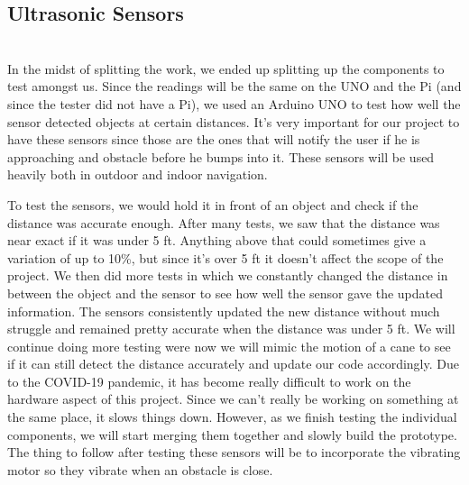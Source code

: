 \documentclass[letterpaper,12pt]{article}
\begin{document}
\subsection{Ultrasonic Sensors}
\newline \ \\
In the midst of splitting the work, we ended up splitting up the components to test amongst us. Since the readings will be the same on the UNO and the Pi (and since the tester did not have a Pi), we used an Arduino UNO to test how well the sensor detected objects at certain distances. It's very important for our project to have these sensors since those are the ones that will notify the user if he is approaching and obstacle before he bumps into it. These sensors will be used heavily both in outdoor and indoor navigation.

\newline 

To test the sensors, we would hold it in front of an object and check if the distance was accurate enough. After many tests, we saw that the distance was near exact if it was under 5 ft. Anything above that could sometimes give a variation of up to 10\%, but since it's over 5 ft it doesn't affect the scope of the project. We then did more tests in which we constantly changed the distance in between the object and the sensor to see how well the sensor gave the updated information. The sensors consistently updated the new distance without much struggle and remained pretty accurate when the distance was under 5 ft. We will continue doing more testing were now we will mimic the motion of a cane to see if it can still detect the distance accurately and update our code accordingly. Due to the COVID-19 pandemic, it has become really difficult to work on the hardware aspect of this project. Since we can't really be working on something at the same place, it slows things down. However, as we finish testing the individual components, we will start merging them together and slowly build the prototype. The thing to follow after testing these sensors will be to incorporate the vibrating motor so they vibrate when an obstacle is close.
\end{document}

